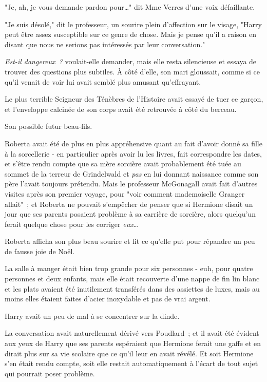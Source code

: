 "Je, ah, je vous demande pardon pour…" dit Mme Verres d'une voix défaillante.

"Je suis désolé," dit le professeur, un sourire plein d'affection sur le visage, "Harry peut être assez susceptible sur ce genre de chose. Mais je pense qu'il a raison en disant que nous ne serions pas intéressés par leur conversation."

\emph{Est-il dangereux~?} voulait-elle demander, mais elle resta silencieuse et essaya de trouver des questions plus subtiles. À côté d'elle, son mari gloussait, comme si ce qu'il venait de voir lui avait semblé plus amusant qu'effrayant.

Le plus terrible Seigneur des Ténèbres de l'Histoire avait essayé de tuer ce garçon, et l'enveloppe calcinée de son corps avait été retrouvée à côté du berceau.

Son possible futur beau-fils.

Roberta avait été de plus en plus appréhensive quant au fait d'avoir donné sa fille à la sorcellerie - en particulier après avoir lu les livres, fait correspondre les dates, et s'être rendu compte que sa mère sorcière avait probablement été tuée au sommet de la terreur de Grindelwald et \emph{pas} en lui donnant naissance comme son père l'avait toujours prétendu. Mais le professeur McGonagall avait fait d'autres visites après son premier voyage, pour "voir comment mademoiselle Granger allait"~; et Roberta ne pouvait s'empêcher de penser que si Hermione disait un jour que ses parents posaient problème à sa carrière de sorcière, alors quelqu'un ferait quelque chose pour les corriger \emph{eux}…

Roberta afficha son plus beau sourire et fit ce qu'elle put pour répandre un peu de fausse joie de Noël.

\later

La salle à manger était bien trop grande pour six personnes - euh, pour quatre personnes et deux enfants, mais elle était recouverte d'une nappe de fin lin blanc et les plats avaient été inutilement transférés dans des assiettes de luxes, mais au moins elles étaient faites d'acier inoxydable et pas de vrai argent.

Harry avait un peu de mal à se concentrer sur la dinde.

La conversation avait naturellement dérivé vers Poudlard~; et il avait été évident aux yeux de Harry que ses parents espéraient que Hermione ferait une gaffe et en dirait plus sur sa vie scolaire que ce qu'il leur en avait révélé. Et soit Hermione s'en était rendu compte, soit elle restait automatiquement à l'écart de tout sujet qui pourrait poser problème.

